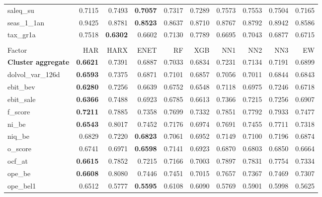 \begin{longtable}{>{\raggedright\arraybackslash}p{2.6cm}rrrrrrrrr}
saleq\_su & 0.7115 & 0.7493 & \textbf{\cellcolor{blue!10}0.7057} & 0.7317 & 0.7289 & 0.7573 & 0.7553 & 0.7504 & 0.7165 \\
seas\_1\_1an & 0.9425 & \cellcolor{blue!10}0.8781 & \textbf{\cellcolor{blue!10}0.8523} & \cellcolor{blue!10}0.8637 & \cellcolor{blue!10}0.8710 & \cellcolor{blue!10}0.8767 & \cellcolor{blue!10}0.8792 & \cellcolor{blue!10}0.8942 & \cellcolor{blue!10}0.8586 \\
tax\_gr1a & 0.7518 & \textbf{\cellcolor{blue!10}0.6302} & \cellcolor{blue!10}0.6602 & \cellcolor{blue!10}0.7130 & 0.7789 & \cellcolor{blue!10}0.6695 & \cellcolor{blue!10}0.7043 & \cellcolor{blue!10}0.6877 & \cellcolor{blue!10}0.6715 \\
\hline
\multicolumn{10}{@{}l}{\textit{Panel H. Profitability}} \\
\hline
Factor & HAR & HARX & ENET & RF & XGB & NN1 & NN2 & NN3 & EW \\
\hline
\textbf{Cluster aggregate} & \textbf{0.6621} & 0.7391 & 0.6887 & 0.7033 & 0.6834 & 0.7231 & 0.7134 & 0.7191 & 0.6899 \\
dolvol\_var\_126d & \textbf{0.6593} & 0.7375 & 0.6871 & 0.7101 & 0.6857 & 0.7056 & 0.7011 & 0.6844 & 0.6843 \\
ebit\_bev & \textbf{0.6280} & 0.7256 & 0.6639 & 0.6752 & 0.6548 & 0.7118 & 0.6975 & 0.7246 & 0.6718 \\
ebit\_sale & \textbf{0.6366} & 0.7488 & 0.6923 & 0.6785 & 0.6613 & 0.7366 & 0.7215 & 0.7256 & 0.6907 \\
f\_score & \textbf{0.7211} & 0.7885 & 0.7358 & 0.7699 & 0.7332 & 0.7851 & 0.7792 & 0.7933 & 0.7477 \\
ni\_be & \textbf{0.6543} & 0.8017 & 0.7452 & 0.7176 & 0.6974 & 0.7691 & 0.7455 & 0.7711 & 0.7318 \\
niq\_be & 0.6829 & 0.7220 & \textbf{\cellcolor{blue!10}0.6823} & 0.7061 & 0.6952 & 0.7149 & 0.7100 & 0.7196 & 0.6874 \\
o\_score & 0.6741 & 0.6971 & \textbf{\cellcolor{blue!10}0.6598} & 0.7141 & 0.6923 & 0.6870 & 0.6803 & 0.6850 & \cellcolor{blue!10}0.6664 \\
ocf\_at & \textbf{0.6615} & 0.7852 & 0.7215 & 0.7166 & 0.7003 & 0.7897 & 0.7831 & 0.7754 & 0.7334 \\
ope\_be & \textbf{0.6608} & 0.8080 & 0.7446 & 0.7451 & 0.7015 & 0.7657 & 0.7367 & 0.7469 & 0.7307 \\
ope\_bel1 & 0.6512 & \cellcolor{blue!10}0.5777 & \textbf{\cellcolor{blue!10}0.5595} & \cellcolor{blue!10}0.6108 & \cellcolor{blue!10}0.6090 & \cellcolor{blue!10}0.5769 & \cellcolor{blue!10}0.5901 & \cellcolor{blue!10}0.5998 & \cellcolor{blue!10}0.5625 \\

\end{longtable}

